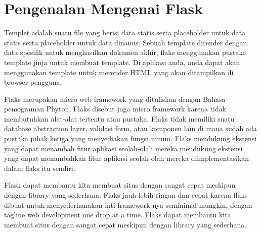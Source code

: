 
\section {Pengenalan Mengenai Flask}
Templet adalah suatu file yang berisi data statis serta placeholder untuk data statis serta placeholder untuk data dinamis. Sebuah 
template dirender dengan data spesifik untuk menghasilkan dokumen akhir, flaks menggunakan pustaka template jinja untuk membuat 
template. Di aplikasi anda, anda dapat akan menggunakan template untuk merender HTML yang akan ditampilkan di browser pengguna.

Flaks merupakan micro web framework yang dituliskan dengan Bahasa pemograman Phyton, Flaks disebut juga micro framework karena tidak 
membutuhkan alat-alat tertentu atau pustaka. Flaks tidak memiliki suatu database abstraction layer, validasi form, atau komponen lain 
di mana sudah ada pustaka pihak ketiga yang menyediakan fungsi umum. Flaks mendukung ekstensi yang dapat menambah fitur aplikasi 
seolah-olah mereka mendukung ekstensi yang dapat menambahkan fitur aplikasi seolah-olah mereka diimplementasikan dalam flaks itu 
sendiri.

Flask dapat membantu kita membuat situs dengan sangat cepat meskipun dengan library yang sederhana. Flaks jauh lebih ringan dan cepat 
karena flaks dibuat untuk menyederhanakan inti framework-nya seminimal mungkin, dengan tagline web development one drop at a time. 
Flaks dapat membantu kita membuat situs dengan sangat cepat meskipun dengan library yang sederhana. 

